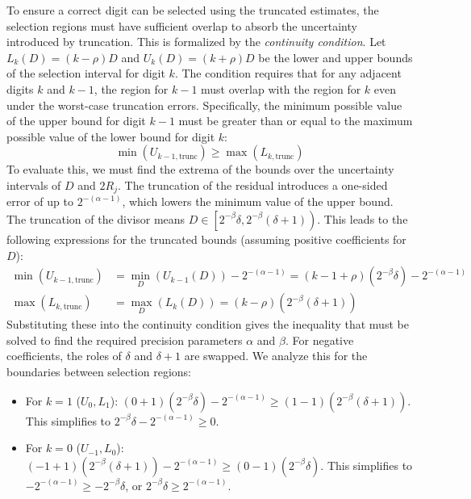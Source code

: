 \documentclass{article}
\begin{document}
To ensure a correct digit can be selected using the truncated estimates, the selection regions must have sufficient overlap to absorb the uncertainty introduced by truncation.
This is formalized by the \emph{continuity condition}.
Let $L_k(D) = (k-\rho)D$ and $U_k(D) = (k+\rho)D$ be the lower and upper bounds of the selection interval for digit $k$.
The condition requires that for any adjacent digits $k$ and $k-1$, the region for $k-1$ must overlap with the region for $k$ even under the worst-case truncation errors.
Specifically, the minimum possible value of the upper bound for digit $k-1$ must be greater than or equal to the maximum possible value of the lower bound for digit $k$:
\begin{equation}
  \label{eq:division:continuity_condition}
  \min(U_{k-1, \text{trunc}}) \geq \max(L_{k, \text{trunc}})
\end{equation}
To evaluate this, we must find the extrema of the bounds over the uncertainty intervals of $D$ and $2R_j$.
The truncation of the residual introduces a one-sided error of up to $2^{-(\alpha-1)}$, which lowers the minimum value of the upper bound.
The truncation of the divisor means $D \in \left[2^{-\beta} \delta, 2^{-\beta} (\delta + 1)\right)$.
This leads to the following expressions for the truncated bounds (assuming positive coefficients for $D$):
\begin{align}
  \label{eq:division:continuity_uk}
  \min(U_{k-1, \text{trunc}}) &= \min_{D}(U_{k-1}(D)) - 2^{-(\alpha-1)} = (k - 1 + \rho) (2^{-\beta} \delta) - 2^{-(\alpha-1)} \\
  \label{eq:division:continuity_lk}
  \max(L_{k, \text{trunc}}) &= \max_{D}(L_{k}(D)) = (k - \rho) (2^{-\beta} (\delta + 1))
\end{align}
Substituting these into the continuity condition gives the inequality that must be solved to find the required precision parameters $\alpha$ and $\beta$.
For negative coefficients, the roles of $\delta$ and $\delta+1$ are swapped.
We analyze this for the boundaries between selection regions:
\begin{itemize}
  \item For $k = 1$ ($U_0, L_1$): $(0+1)(2^{-\beta}\delta) - 2^{-(\alpha-1)} \geq (1-1)(2^{-\beta}(\delta+1))$. This simplifies to $2^{-\beta}\delta - 2^{-(\alpha-1)} \geq 0$.
  \item For $k = 0$ ($U_{-1}, L_0$): $(-1+1)(2^{-\beta}(\delta+1)) - 2^{-(\alpha-1)} \geq (0-1)(2^{-\beta}\delta)$. This simplifies to $-2^{-(\alpha-1)} \geq -2^{-\beta}\delta$, or $2^{-\beta}\delta \geq 2^{-(\alpha-1)}$.
\end{itemize}
\end{document}
